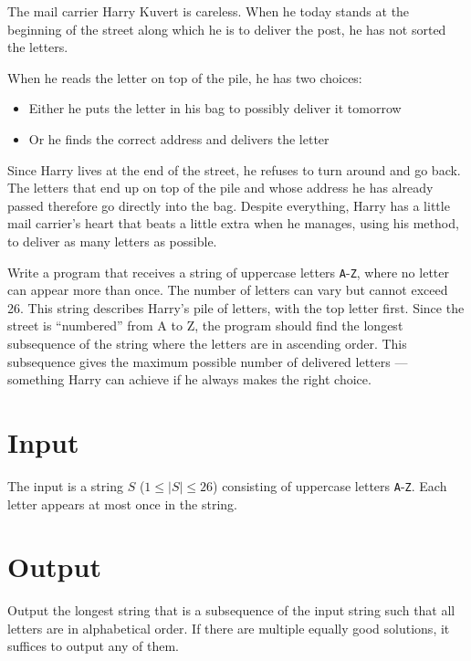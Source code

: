 
The mail carrier Harry Kuvert is careless. When he today stands at the beginning of the street along which he is to deliver the post, he has not sorted the letters.

When he reads the letter on top of the pile, he has two choices:
\begin{itemize}
    \item Either he puts the letter in his bag to possibly deliver it tomorrow
    \item Or he finds the correct address and delivers the letter
\end{itemize}

Since Harry lives at the end of the street, he refuses to turn around and go back. The letters that end up on top of the pile and whose address he has already passed therefore go directly into the bag.
Despite everything, Harry has a little mail carrier's heart that beats a little extra when he manages, using his method, to deliver as many letters as possible.

Write a program that receives a string of uppercase letters \texttt{A}-\texttt{Z}, where no letter can appear more than once. The number of letters can vary but cannot exceed 26. This string describes Harry's pile of letters, with the top letter first. Since the street is ``numbered'' from A to Z, the program should find the longest subsequence of the string where the letters are in ascending order. This subsequence gives the maximum possible number of delivered letters --- something Harry can achieve if he always makes the right choice.

\section*{Input}
The input is a string $S$ ($1 \leq |S| \leq 26$) consisting of uppercase letters \texttt{A}-\texttt{Z}.
Each letter appears at most once in the string.

\section*{Output}
Output the longest string that is a subsequence of the input string such that all letters are in alphabetical order.
If there are multiple equally good solutions, it suffices to output any of them.
